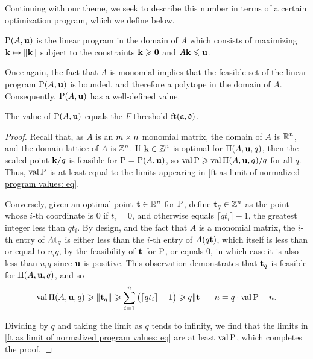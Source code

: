 \documentclass[11pt]{amsart}
\begin{document}
Continuing with our theme, we seek to describe this number in terms of a certain optimization program, which we define below.

\begin{definition}
\label{LP: D}
 $\mathrm{P}(A, \mathbf{u})$ is the linear program in the domain of $A$ which consists of maximizing $\mathbf{k} \mapsto \| \mathbf{k} \|$ subject to the constraints $\mathbf{k} \geqslant \mathbf{0}$ and $A \mathbf{k} \leqslant \mathbf{u}$.
\end{definition}

Once again, the fact that $A$ is monomial implies that the feasible set of the linear program $\mathrm{P}(A,\mathbf{u})$ is bounded, and therefore a polytope in the domain of $A$.  Consequently, $\mathrm{P}(A,\mathbf{u})$ has a well-defined value.


\begin{proposition}
\label{ft as val LP: P}
The value of $\mathrm{P}(A, \mathbf{u})$ equals the $F$-threshold $\operatorname{ft}(\mathfrak{a}, \mathfrak{d})$.
\end{proposition}

\begin{proof}
  Recall that, as $A$ is an $m \times n$ monomial matrix, the domain of $A$ is $\mathbb{R}^n$, and the domain lattice of $A$ is $\mathbb{Z}^n$.  If $\mathbf{k} \in \mathbb{Z}^n$ is optimal for $\Pi(A,\mathbf{u},q)$, then the scaled point $\mathbf{k}/q$ is feasible for $\mathrm{P} = \mathrm{P}(A, \mathbf{u})$, so $\operatorname{val} \mathrm{P} \geqslant \operatorname{val} \Pi(A, \mathbf{u}, q)/q$ for all $q$.
   Thus, $\operatorname{val} \mathrm{P}$ is at least equal to the limits appearing in \eqref{ft as limit of normalized program values: eq}.

   Conversely, given an optimal point $\mathbf{t} \in \mathbb{R}^n$ for $\mathrm{P}$,
   define $\mathbf{t}_q \in \mathbb{Z}^n$ as the point whose $i$-th coordinate is $0$ if $t_i=0$, and otherwise equals $\lceil q t_i \rceil - 1$, the greatest integer less than $q t_i$.
   By design, and the fact that $A$ is a monomial matrix, the $i$-th entry of $A \mathbf{t}_q$ is either less than the $i$-th entry of $A (q \mathbf{t})$, which itself is less than or equal to $u_iq$, by the feasibility of $\mathbf{t}$ for $\mathrm{P}$, or equals $0$,  in which case it is also less than $u_i q$ since $\mathbf{u}$ is positive. This observation demonstrates that $\mathbf{t}_q$ is feasible for $\Pi(A, \mathbf{u}, q)$, and so
   \[\operatorname{val} \Pi(A, \mathbf{u}, q) \geqslant \| \mathbf{t}_q \| \geqslant \sum_{i=1}^n \big(\lceil q t_i \rceil - 1\big) \geqslant q \| \mathbf{t} \| -n = q \cdot \operatorname{val} \mathrm{P} - n.\]
   
   Dividing by $q$ and taking the limit as $q$ tends to infinity, we find that the limits in \eqref{ft as limit of normalized program values: eq} are at least $\operatorname{val} \mathrm{P}$, which completes the proof.
\end{proof}
\end{document}
